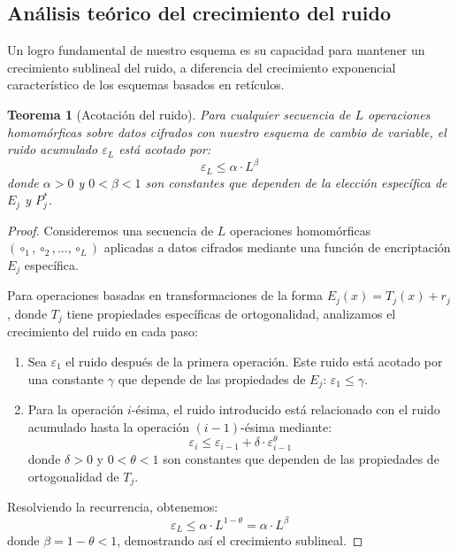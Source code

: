 \documentclass[11pt]{article}
\theoremstyle{plain}
\newtheorem{theorem}{Teorema}
\begin{document}
\subsection{Análisis teórico del crecimiento del ruido}

Un logro fundamental de nuestro esquema es su capacidad para mantener un crecimiento sublineal del ruido, a diferencia del crecimiento exponencial característico de los esquemas basados en retículos.

\begin{theorem}[Acotación del ruido]
Para cualquier secuencia de $L$ operaciones homomórficas sobre datos cifrados con nuestro esquema de cambio de variable, el ruido acumulado $\varepsilon_L$ está acotado por:
\begin{equation}
\varepsilon_L \leq \alpha \cdot L^{\beta}
\end{equation}
donde $\alpha > 0$ y $0 < \beta < 1$ son constantes que dependen de la elección específica de $E_j$ y $P^*_j$.
\end{theorem}

\begin{proof}
Consideremos una secuencia de $L$ operaciones homomórficas $(\circ_1, \circ_2, ..., \circ_L)$ aplicadas a datos cifrados mediante una función de encriptación $E_j$ específica.

Para operaciones basadas en transformaciones de la forma $E_j(x) = T_j(x) + r_j$, donde $T_j$ tiene propiedades específicas de ortogonalidad, analizamos el crecimiento del ruido en cada paso:

\begin{enumerate}
    \item Sea $\varepsilon_1$ el ruido después de la primera operación. Este ruido está acotado por una constante $\gamma$ que depende de las propiedades de $E_j$: $\varepsilon_1 \leq \gamma$.
    \item Para la operación $i$-ésima, el ruido introducido está relacionado con el ruido acumulado hasta la operación $(i-1)$-ésima mediante:
    \begin{equation}
    \varepsilon_i \leq \varepsilon_{i-1} + \delta \cdot \varepsilon_{i-1}^{\theta}
    \end{equation}
    donde $\delta > 0$ y $0 < \theta < 1$ son constantes que dependen de las propiedades de ortogonalidad de $T_j$.
\end{enumerate}

Resolviendo la recurrencia, obtenemos:
\begin{equation}
\varepsilon_L \leq \alpha \cdot L^{1-\theta} = \alpha \cdot L^{\beta}
\end{equation}
donde $\beta = 1-\theta < 1$, demostrando así el crecimiento sublineal.
\end{proof}
\end{document}

